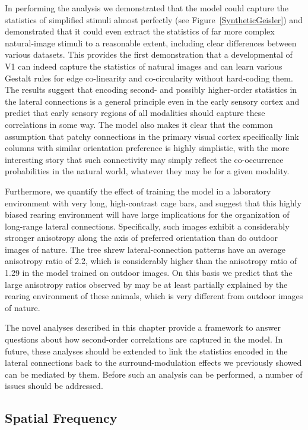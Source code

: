 In performing the analysis we demonstrated that the model could
capture the statistics of simplified stimuli almost perfectly (see
Figure~\ref{SyntheticGeisler}) and demonstrated that it could even
extract the statistics of far more complex natural-image stimuli to a
reasonable extent, including clear differences between various
datasets. This provides the first demonstration that a developmental
of V1 can indeed capture the statistics of natural images and can
learn various Gestalt rules for edge co-linearity and co-circularity
without hard-coding them. The results suggest that encoding second-
and possibly higher-order statistics in the lateral connections is a
general principle even in the early sensory cortex and predict that
early sensory regions of all modalities should capture these
correlations in some way. The model also makes it clear that the
common assumption that patchy connections in the primary visual cortex
specifically link columns with similar orientation preference is
highly simplistic, with the more interesting story that such
connectivity may simply reflect the co-occurrence probabilities in the
natural world, whatever they may be for a given modality.

Furthermore, we quantify the effect of training the model in a
laboratory environment with very long, high-contrast cage bars, and
suggest that this highly biased rearing environment will have large
implications for the organization of long-range lateral connections.
Specifically, such images exhibit a considerably stronger anisotropy
along the axis of preferred orientation than do outdoor images of
nature.  The tree shrew lateral-connection patterns have an average
anisotropy ratio of 2.2, which is considerably higher than the
anisotropy ratio of 1.29 in the model trained on outdoor images. On
this basis we predict that the large anisotropy ratios observed by
\citep{Bosking1997} may be at least partially explained by the rearing
environment of these animals, which is very different from outdoor
images of nature.

The novel analyses described in this chapter provide a framework to
answer questions about how second-order correlations are captured in
the model. In future, these analyses should be extended to link the
statistics encoded in the lateral connections back to the
surround-modulation effects we previously showed can be mediated by
them. Before such an analysis can be performed, a number of issues
should be addressed.

\subsection{Spatial Frequency}

